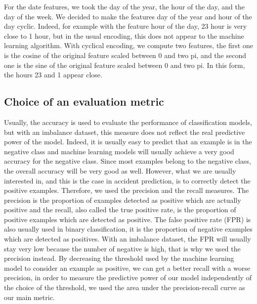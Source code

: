 \documentclass[conference]{IEEEtran}
\begin{document}
For the date features, we took the day of the year, the hour of the day, and the day of the week.
We decided to make the features day of the year and hour of the day cyclic.
Indeed, for example with the feature hour of the day, 23 hour is very close to 1 hour, but in the usual encoding, this does not appear to the machine learning algorithm.
With cyclical encoding, we compute two features, the first one is the cosine of the original feature scaled between 0 and two pi, and the second one is the sine of the original feature scaled between 0 and two pi.
In this form, the hours 23 and 1 appear close.

\subsection{Choice of an evaluation metric}
Usually, the accuracy is used to evaluate the performance of classification models, but with an imbalance dataset, this measure does not reflect the real predictive power of the model.
Indeed, it is usually easy to predict that an example is in the negative class and machine learning models will usually achieve a very good accuracy for the negative class.
Since most examples belong to the negative class, the overall accuracy will be very good as well.
However, what we are usually interested in, and this is the case in accident prediction, is to correctly detect the positive examples.
Therefore, we used the precision and the recall measures.
The precision is the proportion of examples detected as positive which are actually positive and the recall, also called the true positive rate, is the proportion of positive examples which are detected as positive.
The false positive rate (FPR) is also usually used in binary classification, it is the proportion of negative examples which are detected as positives.
With an imbalance dataset, the FPR will usually stay very low because the number of negative is high, that is why we used the precision instead.
By decreasing the threshold used by the machine learning model to consider an example as positive, we can get a better recall with a worse precision, in order to measure the predictive power of our model independently of the choice of the threshold, we used the area under the precision-recall curve as our main metric.
\end{document}
